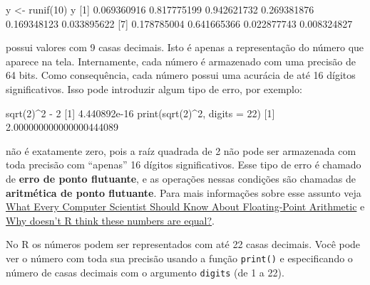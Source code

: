 \documentclass[
  10pt,
  a4paper]{book}
\newenvironment{Shaded}{\begin{snugshade}}{\end{snugshade}}
\newcommand{\AttributeTok}[1]{\textcolor[rgb]{0.77,0.63,0.00}{#1}}
\newcommand{\DecValTok}[1]{\textcolor[rgb]{0.00,0.00,0.81}{#1}}
\newcommand{\FloatTok}[1]{\textcolor[rgb]{0.00,0.00,0.81}{#1}}
\newcommand{\FunctionTok}[1]{\textcolor[rgb]{0.00,0.00,0.00}{#1}}
\newcommand{\NormalTok}[1]{#1}
\newcommand{\OtherTok}[1]{\textcolor[rgb]{0.56,0.35,0.01}{#1}}
\newcommand{\SpecialCharTok}[1]{\textcolor[rgb]{0.00,0.00,0.00}{#1}}
\begin{document}
\begin{Shaded}
\begin{Highlighting}[]
\NormalTok{y }\OtherTok{\textless{}{-}} \FunctionTok{runif}\NormalTok{(}\DecValTok{10}\NormalTok{)}
\NormalTok{y}
\NormalTok{ [}\DecValTok{1}\NormalTok{] }\FloatTok{0.069360916} \FloatTok{0.817775199} \FloatTok{0.942621732} \FloatTok{0.269381876} \FloatTok{0.169348123} \FloatTok{0.033895622}
\NormalTok{ [}\DecValTok{7}\NormalTok{] }\FloatTok{0.178785004} \FloatTok{0.641665366} \FloatTok{0.022877743} \FloatTok{0.008324827}
\end{Highlighting}
\end{Shaded}

possui valores com 9 casas decimais. Isto é apenas a representação do
número que aparece na tela. Internamente, cada número é armazenado com
uma precisão de 64 bits. Como consequência, cada número possui uma
acurácia de até 16 dígitos significativos. Isso pode introduzir algum
tipo de erro, por exemplo:

\begin{Shaded}
\begin{Highlighting}[]
\FunctionTok{sqrt}\NormalTok{(}\DecValTok{2}\NormalTok{)}\SpecialCharTok{\^{}}\DecValTok{2} \SpecialCharTok{{-}} \DecValTok{2}
\NormalTok{[}\DecValTok{1}\NormalTok{] }\FloatTok{4.440892e{-}16}
\FunctionTok{print}\NormalTok{(}\FunctionTok{sqrt}\NormalTok{(}\DecValTok{2}\NormalTok{)}\SpecialCharTok{\^{}}\DecValTok{2}\NormalTok{, }\AttributeTok{digits =} \DecValTok{22}\NormalTok{)}
\NormalTok{[}\DecValTok{1}\NormalTok{] }\FloatTok{2.000000000000000444089}
\end{Highlighting}
\end{Shaded}

não é exatamente zero, pois a raíz quadrada de 2 não pode ser armazenada
com toda precisão com ``apenas'' 16 dígitos significativos. Esse tipo de
erro é chamado de \textbf{erro de ponto flutuante}, e as operações nessas
condições são chamadas de \textbf{aritmética de ponto flutuante}. Para mais
informações sobre esse assunto veja \href{http://www.validlab.com/goldberg/paper.pdf}{What Every Computer Scientist
Should Know About Floating-Point
Arithmetic} e \href{http://cran-r.c3sl.ufpr.br/doc/FAQ/R-FAQ.html\#Why-doesn_0027t-R-think-these-numbers-are-equal_003f}{Why doesn't R
think these numbers are
equal?}.

No R os números podem ser representados com até 22 casas decimais. Você
pode ver o número com toda sua precisão usando a função \texttt{print()} e
especificando o número de casas decimais com o argumento \texttt{digits} (de 1
a 22).
\end{document}
